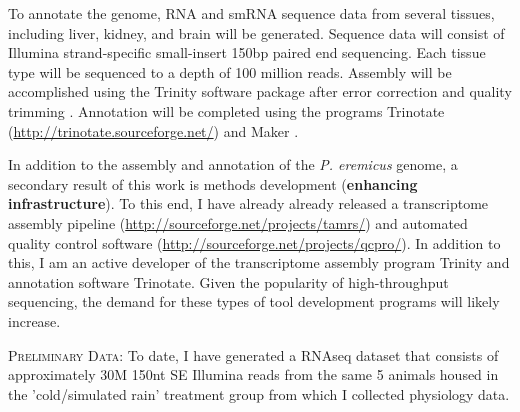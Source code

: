 \documentclass[11pt]{article}
\begin{document}
To annotate the genome, RNA and smRNA sequence data from several tissues, including liver, kidney, and brain will be generated. Sequence data will consist of Illumina strand-specific small-insert 150bp paired end sequencing. Each tissue type will be sequenced to a depth of 100 million reads.  Assembly will be accomplished using the Trinity software package \citep{Haas:2013jq,Grabherr:2011jb} after error correction \citep{MacManes:2013ec} and quality trimming \citep{MacManes:2013ex}. Annotation will be completed using the programs Trinotate (\url{http://trinotate.sourceforge.net/}) and Maker \citep{Cantarel:2008jo}. 

In addition to the assembly and annotation of the \textit{P. eremicus} genome, a secondary result of this work is methods development (\textbf{enhancing infrastructure}). To this end, I have already already released a transcriptome assembly pipeline (\url{http://sourceforge.net/projects/tamrs/}) and automated quality control software (\url{http://sourceforge.net/projects/qcpro/}). In addition to this, I am an active developer of the transcriptome assembly program Trinity and annotation software Trinotate. Given the popularity of high-throughput sequencing, the demand for these types of tool development programs will likely increase.  

\textsc{{Preliminary Data:}} To date, I have generated a RNAseq dataset that consists of approximately 30M 150nt SE Illumina reads from the same 5 animals housed in the 'cold/simulated rain' treatment group from which I collected physiology data. 
\end{document}
